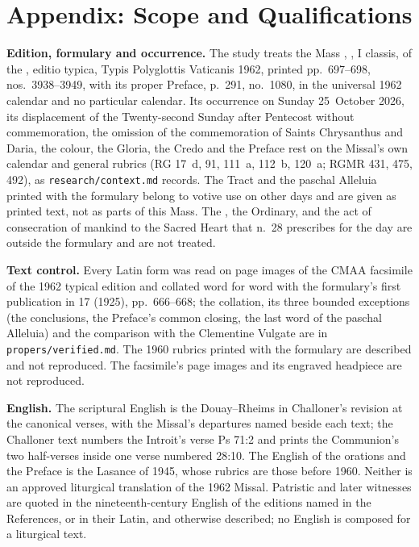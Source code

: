 \section{Appendix: Scope and Qualifications}
\label{sec:scope}

{\small
\textbf{Edition, formulary and occurrence.} The study treats the Mass
, , I classis,
of the , editio typica, Typis Polyglottis Vaticanis 1962,
printed pp.~697--698, nos.~3938--3949, with its proper Preface, p.~291,
no.~1080, in the universal 1962 calendar and no particular calendar. Its
occurrence on Sunday 25~October 2026, its displacement of the Twenty-second
Sunday after Pentecost without commemoration, the omission of the
commemoration of Saints Chrysanthus and Daria, the colour, the Gloria, the
Credo and the Preface rest on the Missal's own calendar and general rubrics
(RG 17~d, 91, 111~a, 112~b, 120~a; RGMR 431, 475, 492), as
\texttt{research/context.md} records. The Tract and the paschal Alleluia
printed with the formulary belong to votive use on other days and are given as
printed text, not as parts of this Mass. The , the Ordinary,
and the act of consecration of mankind to the Sacred Heart that  n.~28 prescribes for the day are outside the formulary and are not
treated.

\textbf{Text control.} Every Latin form was read on page images of the CMAA
facsimile of the 1962 typical edition and collated word for word with the
formulary's first publication in  17 (1925),
pp.~666--668; the collation, its three bounded exceptions (the conclusions,
the Preface's common closing, the last word of the paschal Alleluia) and the
comparison with the Clementine Vulgate are in \texttt{propers/verified.md}.
The 1960 rubrics printed with the formulary are described and not reproduced.
The facsimile's page images and its engraved headpiece are not reproduced.

\textbf{English.} The scriptural English is the Douay--Rheims in Challoner's
revision at the canonical verses, with the Missal's departures named beside
each text; the Challoner text numbers the Introit's verse Ps 71:2 and prints
the Communion's two half-verses inside one verse numbered 28:10. The English
of the orations and the Preface is the Lasance  of 1945,
whose rubrics are those before 1960. Neither is an approved liturgical
translation of the 1962 Missal. Patristic and later witnesses are quoted in
the nineteenth-century English of the editions named in the References, or in
their Latin, and otherwise described; no English is composed for a liturgical
text.

}
